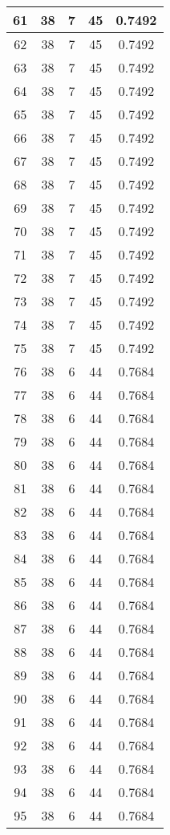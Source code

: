 \documentclass[letterpaper, 12pt]{article}
\begin{document}
\begin{longtable}{|c|c|c|c|c|}
61 & 38 & 7 & 45 & 0.7492 \\
\hline
62 & 38 & 7 & 45 & 0.7492 \\
\hline
63 & 38 & 7 & 45 & 0.7492 \\
\hline
64 & 38 & 7 & 45 & 0.7492 \\
\hline
65 & 38 & 7 & 45 & 0.7492 \\
\hline
66 & 38 & 7 & 45 & 0.7492 \\
\hline
67 & 38 & 7 & 45 & 0.7492 \\
\hline
68 & 38 & 7 & 45 & 0.7492 \\
\hline
69 & 38 & 7 & 45 & 0.7492 \\
\hline
70 & 38 & 7 & 45 & 0.7492 \\
\hline
71 & 38 & 7 & 45 & 0.7492 \\
\hline
72 & 38 & 7 & 45 & 0.7492 \\
\hline
73 & 38 & 7 & 45 & 0.7492 \\
\hline
74 & 38 & 7 & 45 & 0.7492 \\
\hline
75 & 38 & 7 & 45 & 0.7492 \\
\hline
76 & 38 & 6 & 44 & 0.7684 \\
\hline
77 & 38 & 6 & 44 & 0.7684 \\
\hline
78 & 38 & 6 & 44 & 0.7684 \\
\hline
79 & 38 & 6 & 44 & 0.7684 \\
\hline
80 & 38 & 6 & 44 & 0.7684 \\
\hline
81 & 38 & 6 & 44 & 0.7684 \\
\hline
82 & 38 & 6 & 44 & 0.7684 \\
\hline
83 & 38 & 6 & 44 & 0.7684 \\
\hline
84 & 38 & 6 & 44 & 0.7684 \\
\hline
85 & 38 & 6 & 44 & 0.7684 \\
\hline
86 & 38 & 6 & 44 & 0.7684 \\
\hline
87 & 38 & 6 & 44 & 0.7684 \\
\hline
88 & 38 & 6 & 44 & 0.7684 \\
\hline
89 & 38 & 6 & 44 & 0.7684 \\
\hline
90 & 38 & 6 & 44 & 0.7684 \\
\hline
91 & 38 & 6 & 44 & 0.7684 \\
\hline
92 & 38 & 6 & 44 & 0.7684 \\
\hline
93 & 38 & 6 & 44 & 0.7684 \\
\hline
94 & 38 & 6 & 44 & 0.7684 \\
\hline
95 & 38 & 6 & 44 & 0.7684 \\

\end{longtable}
\end{document}
